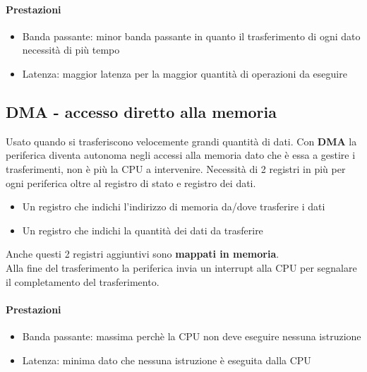 \documentclass[12pt, a4paper, openany]{book}
\begin{document}
\paragraph*{Prestazioni}
\begin{itemize}
    \item Banda passante: minor banda passante in quanto il trasferimento di ogni dato necessità di più tempo
    \item Latenza: maggior latenza per la maggior quantità di operazioni da eseguire 
\end{itemize}

\subsection*{DMA - accesso diretto alla memoria}
Usato quando si trasferiscono velocemente grandi quantità di dati.
Con \textbf{DMA} la periferica diventa autonoma negli accessi alla memoria dato che è essa a
gestire i trasferimenti, non è più la CPU a intervenire. Necessità di 2 registri in più
per ogni periferica oltre al registro di stato e registro dei dati.
\begin{itemize}
    \item Un registro che indichi l'indirizzo di memoria da/dove trasferire i dati
    \item Un registro che indichi la quantità dei dati da trasferire
\end{itemize}
Anche questi 2 registri aggiuntivi sono \textbf{mappati in memoria}.
\\ Alla fine del trasferimento la periferica invia un interrupt alla CPU per segnalare il completamento 
del trasferimento.
\paragraph*{Prestazioni}
\begin{itemize}
    \item Banda passante: massima perchè la CPU non deve eseguire nessuna istruzione
    \item Latenza: minima dato che nessuna istruzione è eseguita dalla CPU
\end{itemize}


\end{document}
